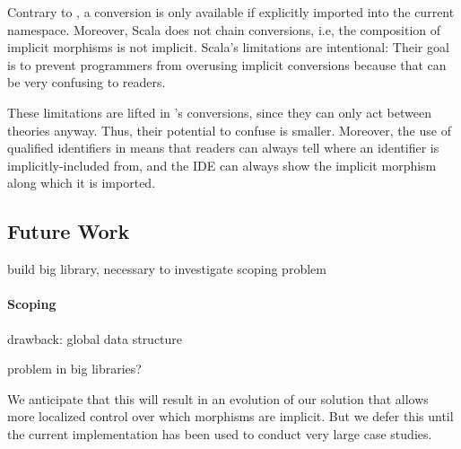 Contrary to \mmt, a conversion is only available if explicitly imported into the current namespace.
Moreover, Scala does not chain conversions, i.e, the composition of implicit morphisms is not implicit.
Scala's limitations are intentional: Their goal is to prevent programmers from overusing implicit conversions because that can be very confusing to readers.

These limitations are lifted in \mmt's conversions, since they can only act between theories anyway.
Thus, their potential to confuse is smaller.
Moreover, the use of qualified identifiers in \mmt means that readers can always tell where an identifier is implicitly-included from, and the \mmt IDE can always show the implicit morphism along which it is imported.

\subsection{Future Work}


build big library, necessary to investigate scoping problem

\paragraph{Scoping}
drawback: global data structure

problem in big libraries?

We anticipate that this will result in an evolution of our solution that allows more localized control over which morphisms are implicit.
But we defer this until the current implementation has been used to conduct very large case studies.